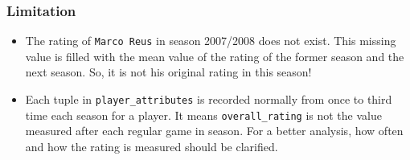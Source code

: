 \documentclass[11pt]{article}
\providecommand{\tightlist}{%
      \setlength{\itemsep}{0pt}\setlength{\parskip}{0pt}}
\begin{document}
    \subsubsection{Limitation}\label{limitation}

\begin{itemize}
\tightlist
\item
  The rating of \texttt{Marco\ Reus} in season 2007/2008 does not exist.
  This missing value is filled with the mean value of the rating of the
  former season and the next season. So, it is not his original rating
  in this season!
\item
  Each tuple in \texttt{player\_attributes} is recorded normally from
  once to third time each season for a player. It means
  \texttt{overall\_rating} is not the value measured after each regular
  game in season. For a better analysis, how often and how the rating is
  measured should be clarified.
\end{itemize}


    
    
    
    
\end{document}
